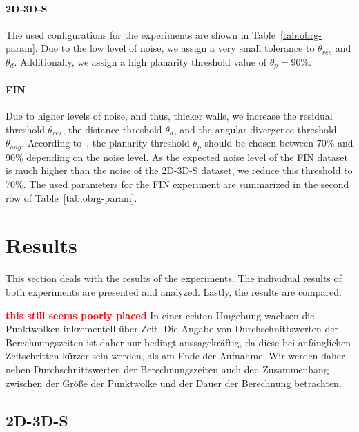 \documentclass[main.tex]{subfiles}
\begin{document}

\paragraph{2D-3D-S}
The used configurations for the experiments are shown in Table~\ref{tab:obrg-param}.
Due to the low level of noise, we assign a very small tolerance to $\theta_{res}$ and $\theta_d$. Additionally, we assign a high
planarity threshold value of $\theta_p = 90\%$.

\paragraph{FIN}
Due to higher levels of noise, and thus, thicker walls, we increase the residual threshold $\theta_{res}$, the distance
threshold $\theta_d$, and the angular divergence threshold $\theta_{ang}$. According to~\cite[Section~3.4]{Vo_Truong-Hong_Laefer_Bertolotto_2015},
the planarity threshold $\theta_p$ should be chosen between 70\% and 90\% depending on the noise level. As the expected noise level of the
FIN dataset is much higher than the noise of the 2D-3D-S dataset, we reduce this threshold to 70\%.
The used parameters for the FIN experiment are summarized in the second row of Table~\ref{tab:obrg-param}.


\section{Results}
This section deals with the results of the experiments. 
The individual results of both experiments are presented and analyzed. Lastly, the results are compared.

\textbf{\textcolor{red}{this still seems poorly placed}}
In einer echten Umgebung wachsen die Punktwolken inkrementell über Zeit. 
Die Angabe von Durchschnittswerten der Berechnungszeiten ist daher nur bedingt aussagekräftig, da diese bei anfänglichen Zeitschritten 
kürzer sein werden, als am Ende der Aufnahme. Wir werden daher neben Durchschnittswerten der Berechnungszeiten auch 
den Zusammenhang zwischen der Größe der Punktwolke und der Dauer der Berechnung betrachten.

\subsection{2D-3D-S}
\end{document}
